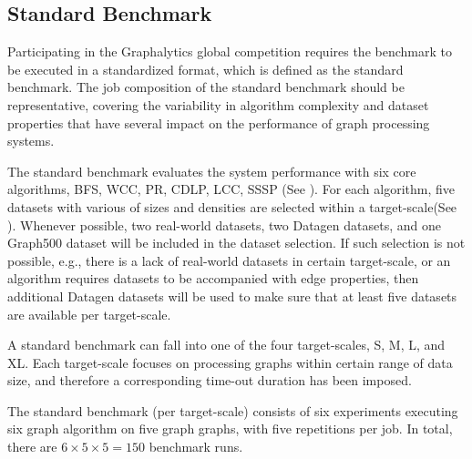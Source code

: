 \subsection{Standard Benchmark}
\label{sec:process:type:standard}
Participating in the Graphalytics global competition requires the benchmark to be executed in a standardized format, which is defined as the standard benchmark. The job composition of the standard benchmark should be representative, covering the variability in algorithm complexity and dataset properties that have several impact on the performance of graph processing systems.

The standard benchmark evaluates the system performance with six core algorithms, BFS, WCC, PR, CDLP, LCC, SSSP (See ). For each algorithm, five datasets with various of sizes and densities are selected within a target-scale(See ). Whenever possible, two real-world datasets, two Datagen datasets, and one Graph500 dataset will be included in the dataset selection. If such selection is not possible, e.g., there is a lack of real-world datasets in certain target-scale, or an algorithm requires datasets to be accompanied with edge properties, then additional Datagen datasets will be used to make sure that at least five datasets are available per target-scale.

A standard benchmark can fall into one of the four target-scales, S, M, L, and XL. Each target-scale focuses on processing graphs within certain range of data size, and therefore a corresponding time-out duration has been imposed.  

The standard benchmark (per target-scale) consists of six experiments executing six graph algorithm on five graph graphs, with five repetitions per job. In total, there are $6 \times 5 \times 5 = 150$ benchmark runs.



